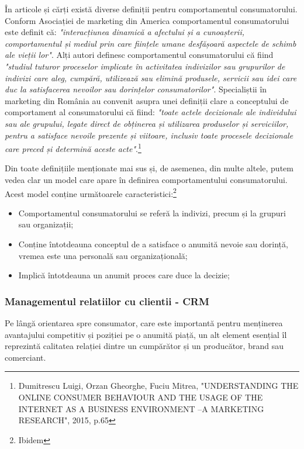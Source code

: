 \documentclass[a4paper, 12pt]{article}
\begin{document}
		\quad În articole și cărți există diverse definiții pentru comportamentul consumatorului. Conform Asociației de marketing din America comportamentul consumatorului este definit că: \textit{"interacțiunea dinamică a afectului și a cunoașterii, comportamentul și mediul prin care ființele umane desfășoară aspectele de schimb ale vieții lor"}. Alți autori definesc comportamentul consumatorului că fiind \textit{"studiul tuturor proceselor implicate în activitatea indivizilor sau grupurilor de indivizi care aleg, cumpără, utilizează sau elimină produsele, servicii sau idei care duc la satisfacerea nevoilor sau dorințelor consumatorilor"}. Specialiștii în marketing din România au convenit asupra unei definiții clare a conceptului de comportament al consumatorului că fiind: \textit{"toate actele decizionale ale individului sau ale grupului, legate direct de obținerea și utilizarea produselor și serviciilor, pentru a satisface nevoile prezente și viitoare, inclusiv toate procesele decizionale care preced și determină aceste acte"}.\footnote{Dumitrescu Luigi, Orzan Gheorghe, Fuciu Mitrea, "UNDERSTANDING THE ONLINE CONSUMER BEHAVIOUR AND THE USAGE OF THE INTERNET AS A BUSINESS ENVIRONMENT –A MARKETING RESEARCH", 2015, p.65} 
		
		\quad Din toate definițiile menționate mai sus și, de asemenea, din multe altele, putem vedea clar un model care apare în definirea comportamentului consumatorului. Acest model conține următoarele caracteristici:\footnote{Ibidem}

		\begin{itemize}
			\item Comportamentul consumatorului se referă la indivizi, precum și la grupuri sau
			organizații;
			\item Conține întotdeauna conceptul de a satisface o anumită nevoie sau dorință,
			vremea este una personală sau organizațională;
			\item Implică întotdeauna un anumit proces care duce la decizie;
		\end{itemize}
	
			\subsubsection{Managementul relatiilor cu clientii - CRM}
		\quad Pe lângă orientarea spre consumator, care este importantă pentru menținerea avantajului competitiv și poziției pe o anumită piață, un alt element esențial îl reprezintă calitatea relației dintre un cumpărător și un producător, brand sau comerciant.
		
\end{document}
